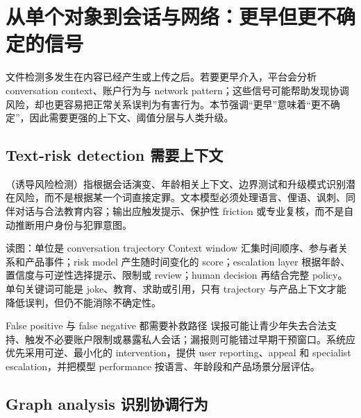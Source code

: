 \section{从单个对象到会话与网络：更早但更不确定的信号}

文件检测多发生在内容已经产生或上传之后。若要更早介入，平台会分析 conversation context、账户行为与 network pattern；这些信号可能帮助发现协调风险，却也更容易把正常关系误判为有害行为。本节强调“更早”意味着“更不确定”，因此需要更强的上下文、阈值分层与人类升级。

\subsection{Text-risk detection 需要上下文}

（诱导风险检测）指根据会话演变、年龄相关上下文、边界测试和升级模式识别潜在风险，而不是根据某一个词直接定罪。文本模型必须处理语言、俚语、讽刺、同伴对话与合法教育内容；输出应触发提示、保护性 friction 或专业复核，而不是自动推断用户身份与犯罪意图。


\begin{knowledgebox}{读图：单位是 conversation trajectory}
Context window 汇集时间顺序、参与者关系和产品事件；risk model 产生随时间变化的 score；escalation layer 根据年龄、置信度与可逆性选择提示、限制或 review；human decision 再结合完整 policy。单句关键词可能是 joke、教育、求助或引用，只有 trajectory 与产品上下文才能降低误判，但仍不能消除不确定性。
\end{knowledgebox}

\begin{warningbox}{False positive 与 false negative 都需要补救路径}
误报可能让青少年失去合法支持、触发不必要账户限制或暴露私人会话；漏报则可能错过早期干预窗口。系统应优先采用可逆、最小化的 intervention，提供 user reporting、appeal 和 specialist escalation，并把模型 performance 按语言、年龄段和产品场景分层评估。
\end{warningbox}


\subsection{Graph analysis 识别协调行为}

